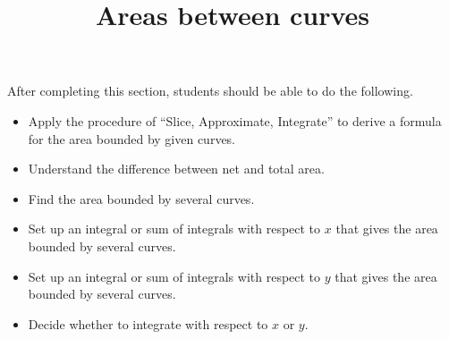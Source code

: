 \documentclass{ximera}
\title{Areas between curves}
\begin{document}
\begin{abstract}
\end{abstract}

\maketitle

\begin{sectionOutcomes}

After completing this section, students should be able to do the following.

\begin{itemize}
\item Apply the procedure of ``Slice, Approximate, Integrate'' to derive a formula for the area bounded by given curves.
\item Understand the difference between net and total area.
\item Find the area bounded by several curves.
\item Set up an integral or sum of integrals with respect to $x$ that gives the area bounded by several curves.
\item Set up an integral or sum of integrals with respect to $y$ that gives the area bounded by several curves.
\item Decide whether to integrate with respect to $x$ or $y$.
\end{itemize}

\end{sectionOutcomes}
\end{document}
